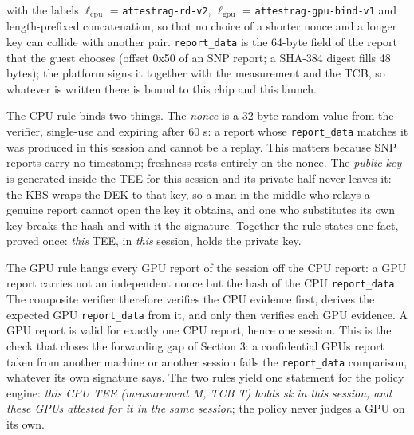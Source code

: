 \documentclass[letterpaper,twocolumn,10pt]{article}
\begin{document}
with the labels \(\ell_{\mathrm{cpu}}\) = \texttt{attestrag-rd-v2}, \(\ell_{\mathrm{gpu}}\) = \texttt{attestrag-gpu-bind-v1} and length-prefixed concatenation, so that no choice of a shorter nonce and a longer key can collide with another pair. \texttt{report\_data} is the 64-byte field of the report that the guest chooses (offset 0x50 of an SNP report; a SHA-384 digest fills 48 bytes); the platform signs it together with the measurement and the TCB, so whatever is written there is bound to this chip and this launch.

The CPU rule binds two things. The \emph{nonce} is a 32-byte random value from the verifier, single-use and expiring after 60 s: a report whose \texttt{report\_data} matches it was produced in this session and cannot be a replay. This matters because SNP reports carry no timestamp; freshness rests entirely on the nonce. The \emph{public key} is generated inside the TEE for this session and its private half never leaves it: the KBS wraps the DEK to that key, so a man-in-the-middle who relays a genuine report cannot open the key it obtains, and one who substitutes its own key breaks the hash and with it the signature. Together the rule states one fact, proved once: \emph{this} TEE, in \emph{this} session, holds the private key.

The GPU rule hangs every GPU report of the session off the CPU report: a GPU report carries not an independent nonce but the hash of the CPU \texttt{report\_data}. The composite verifier therefore verifies the CPU evidence first, derives the expected GPU \texttt{report\_data} from it, and only then verifies each GPU evidence. A GPU report is valid for exactly one CPU report, hence one session. This is the check that closes the forwarding gap of Section 3: a confidential GPU\textquotesingle s report taken from another machine or another session fails the \texttt{report\_data} comparison, whatever its own signature says. The two rules yield one statement for the policy engine: \emph{this CPU TEE (measurement M, TCB T) holds sk in this session, and these GPUs attested for it in the same session}; the policy never judges a GPU on its own.
\end{document}
